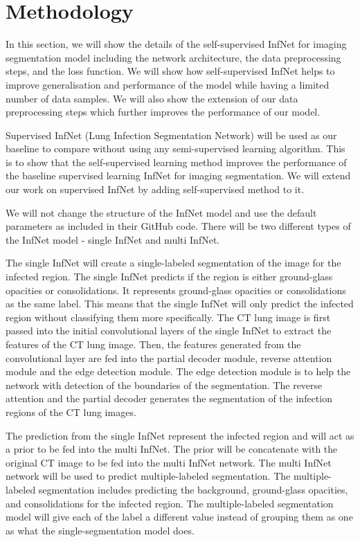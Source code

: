 \section{Methodology}


In this section, we will show the details of the self-supervised InfNet for imaging segmentation model including the network architecture, the data preprocessing steps, and the loss function. We will show how self-supervised InfNet helps to improve generalisation and performance of the model while having a limited number of data samples. We will also show the extension of our data preprocessing steps which further improves the performance of our model.

Supervised InfNet (Lung Infection Segmentation Network) will be used as our baseline to compare without using any semi-supervised learning algorithm. This is to show that the self-supervised learning method  improves the performance of the baseline supervised learning InfNet for imaging segmentation. We will extend our work on supervised InfNet by adding self-supervised method to it.

We will not change the structure of the InfNet model and use the default parameters as included in their GitHub code. There will be two different types of the InfNet model - single InfNet and multi InfNet. 

The single InfNet will create a single-labeled segmentation of the image for the infected region. The single InfNet predicts if the region is either ground-glass opacities or consolidations. It represents ground-glass opacities or consolidations as the same label. This means that the single InfNet will only predict the infected region without classifying them more specifically.  The CT lung image is first passed into the initial convolutional layers of the single InfNet to extract the features of the CT lung image. Then, the features generated from the convolutional layer are fed into the partial decoder module, reverse attention module and the edge detection module. The edge detection module is to help the network with detection of the boundaries of the segmentation. The reverse attention and the partial decoder generates the segmentation of the infection regions of the CT lung images.

The prediction from the single InfNet represent the infected region and will act as a prior to be fed into the multi InfNet. The prior will be concatenate with the original CT image to be fed into the multi InfNet network. The multi InfNet network will be used to predict multiple-labeled segmentation. The multiple-labeled segmentation includes predicting the background, ground-glass opacities, and consolidations for the infected region. The multiple-labeled segmentation model will give each of the label a different value instead of grouping them as one as what the single-segmentation model does. 

